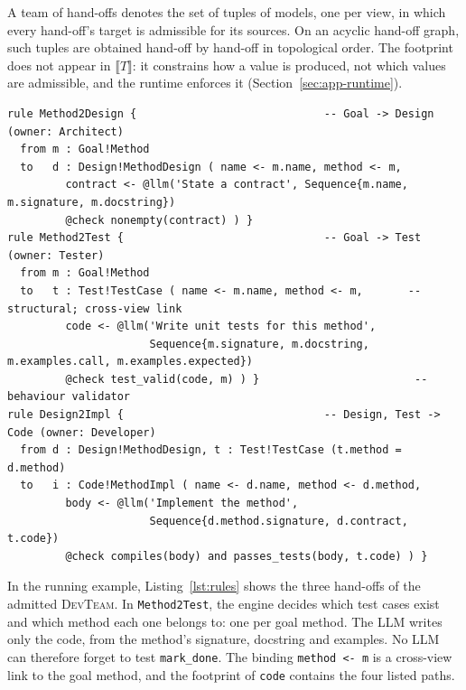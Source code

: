 \documentclass[pdflatex,sn-mathphys-num]{sn-jnl}
\theoremstyle{thmstyleone}%
\theoremstyle{thmstyletwo}%
\theoremstyle{thmstylethree}%
\newcommand{\devteam}{\textsc{DevTeam}}
\newcommand{\code}[1]{\texttt{#1}}
\begin{document}
A team of hand-offs denotes the set of tuples of models, one per view, in which
every hand-off's target is admissible for its sources. On an acyclic hand-off
graph, such tuples are obtained hand-off by hand-off in topological order. The
footprint does not appear in $\llbracket T\rrbracket$: it constrains how a
value is produced, not which values are admissible, and the runtime enforces it
(Section~\ref{sec:app-runtime}).

\begin{lstlisting}[float=tb, language=ATL, style=model, caption={The three hybrid hand-offs of the admitted typed \devteam{}. \code{@llm} marks a stochastic binding (second argument: footprint); \code{@check} its validator (Table~\ref{tab:validators}).}, label={lst:rules}]
rule Method2Design {                             -- Goal -> Design (owner: Architect)
  from m : Goal!Method
  to   d : Design!MethodDesign ( name <- m.name, method <- m,
         contract <- @llm('State a contract', Sequence{m.name, m.signature, m.docstring})
         @check nonempty(contract) ) }
rule Method2Test {                               -- Goal -> Test (owner: Tester)
  from m : Goal!Method
  to   t : Test!TestCase ( name <- m.name, method <- m,       -- structural; cross-view link
         code <- @llm('Write unit tests for this method',
                      Sequence{m.signature, m.docstring, m.examples.call, m.examples.expected})
         @check test_valid(code, m) ) }                        -- behaviour validator
rule Design2Impl {                               -- Design, Test -> Code (owner: Developer)
  from d : Design!MethodDesign, t : Test!TestCase (t.method = d.method)
  to   i : Code!MethodImpl ( name <- d.name, method <- d.method,
         body <- @llm('Implement the method',
                      Sequence{d.method.signature, d.contract, t.code})
         @check compiles(body) and passes_tests(body, t.code) ) }
\end{lstlisting}

In the running example, Listing~\ref{lst:rules} shows the three hand-offs of
the admitted \devteam{}. In \code{Method2Test}, the engine decides which test
cases exist and which method each one belongs to: one per goal method. The LLM
writes only the code, from the method's signature, docstring and examples. No
LLM can therefore forget to test \code{mark\_done}. The binding
\code{method <- m} is a cross-view link to the goal method, and the footprint
of \code{code} contains the four listed paths.

\end{document}
